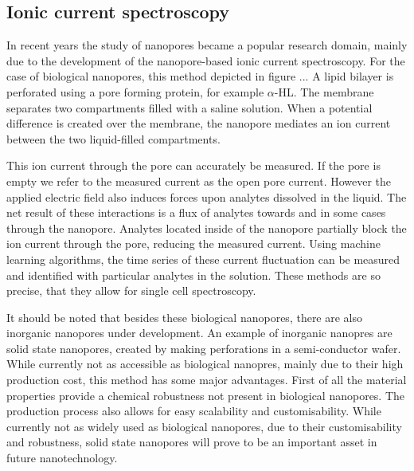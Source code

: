 \subsection{Ionic current spectroscopy}
In recent years the study of nanopores became a popular research domain, mainly
due to the development of the nanopore-based ionic current spectroscopy. For the case of
biological nanopores, this method depicted in figure ... A lipid bilayer is perforated
using a pore forming protein, for example $\alpha$-HL. The membrane separates two
compartments filled with a saline solution. When a potential difference is created
over the membrane, the nanopore mediates an ion current between the two liquid-filled
compartments.

This ion current through the pore can accurately be measured. If the pore is empty we
refer to the measured current as the open pore current.  However the applied electric
field also induces forces upon analytes dissolved in the liquid. The net result of these
interactions is a flux of analytes towards and in some cases through the nanopore.
Analytes located inside of the nanopore partially block the ion current through the pore,
reducing the measured current. Using machine learning algorithms, the time series of
these current fluctuation can be measured and identified with particular analytes in the
solution. These methods are so precise, that they allow for single cell spectroscopy.

It should be noted that besides these biological nanopores, there are also inorganic
nanopores under development. An example of inorganic nanopres are solid state nanopores,
created by making perforations in a semi-conductor wafer. While currently not as
accessible as biological nanopres, mainly due to their high production cost, this method
has some major advantages. First of all the material properties provide a chemical
robustness not present in biological nanopores. The production process also allows for
easy scalability and customisability. While currently not as widely used as biological
nanopores, due to their customisability and robustness, solid state nanopores will prove
to be an important asset in future nanotechnology.
